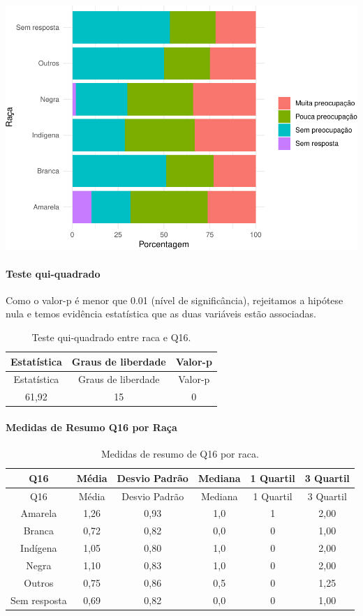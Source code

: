 \documentclass[]{article}
\let\oldparagraph\paragraph
\renewcommand{\paragraph}[1]{\oldparagraph{#1}\mbox{}}
\begin{document}
\begin{center}\includegraphics[width=0.75\linewidth]{relatorio_covid19_files/figure-latex/unnamed-chunk-161-1} \end{center}

\hypertarget{teste-qui-quadrado-15}{%
\paragraph{Teste qui-quadrado}\label{teste-qui-quadrado-15}}

Como o valor-p é menor que 0.01 (nível de significância), rejeitamos a hipótese nula e temos evidência estatística que as duas variáveis estão associadas.

\begin{longtable}[]{@{}ccc@{}}
\caption{\label{tab:unnamed-chunk-163}Teste qui-quadrado entre raca e Q16.}\tabularnewline
\toprule
Estatística & Graus de liberdade & Valor-p\tabularnewline
\midrule
\endfirsthead
\toprule
Estatística & Graus de liberdade & Valor-p\tabularnewline
\midrule
\endhead
61,92 & 15 & 0\tabularnewline
\bottomrule
\end{longtable}

\cleardoublepage

\hypertarget{medidas-de-resumo-q16-por-rauxe7a}{%
\paragraph{Medidas de Resumo Q16 por Raça}\label{medidas-de-resumo-q16-por-rauxe7a}}

\begin{longtable}[]{@{}cccccc@{}}
\caption{\label{tab:unnamed-chunk-164}Medidas de resumo de Q16 por raca.}\tabularnewline
\toprule
Q16 & Média & Desvio Padrão & Mediana & 1 Quartil & 3 Quartil\tabularnewline
\midrule
\endfirsthead
\toprule
Q16 & Média & Desvio Padrão & Mediana & 1 Quartil & 3 Quartil\tabularnewline
\midrule
\endhead
Amarela & 1,26 & 0,93 & 1,0 & 1 & 2,00\tabularnewline
Branca & 0,72 & 0,82 & 0,0 & 0 & 1,00\tabularnewline
Indígena & 1,05 & 0,80 & 1,0 & 0 & 2,00\tabularnewline
Negra & 1,10 & 0,83 & 1,0 & 0 & 2,00\tabularnewline
Outros & 0,75 & 0,86 & 0,5 & 0 & 1,25\tabularnewline
Sem resposta & 0,69 & 0,82 & 0,0 & 0 & 1,00\tabularnewline
\bottomrule
\end{longtable}
\end{document}
